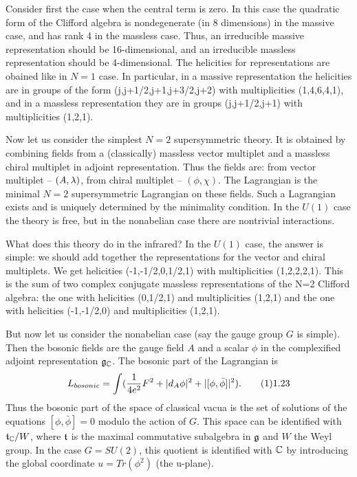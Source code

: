 Consider first the case when the central term is zero.
In this case the quadratic form of the Clifford algebra
is nondegenerate (in 8 dimensions) in the massive case, and
has rank 4 in the massless case. Thus, an irreducible massive representation
should be 16-dimensional, and an irreducible massless representation should be
4-dimensional. The helicities for representations
are obained like in $N=1$ case. In particular,
in a massive representation the helicities are in groups of the form
(j,j+1/2,j+1,j+3/2,j+2) with multiplicities (1,4,6,4,1), and
in a massless representation they are in groups (j,j+1/2,j+1) with
multiplicities (1,2,1).

Now let us consider the simplest $N=2$ supersymmetric theory.
It is obtained by combining fields from a (classically)
massless vector multiplet
and a massless chiral multiplet in adjoint representation.
Thus the fields are: from vector multiplet -- $(A,\lambda)$,
from chiral multiplet -- $(\phi,\chi)$.
The Lagrangian is the minimal $N=2$ supersymmetric Lagrangian on these fields.
Such a Lagrangian exists and is uniquely determined by the minimality
condition. In the $U(1)$ case the theory is free, but
in the nonabelian case there are nontrivial interactions.

What does this theory do in the infrared? In the $U(1)$ case, the answer
is simple: we should add together the representations for the vector and
chiral multiplets. We get helicities (-1,-1/2,0,1/2,1)
with multiplicities (1,2,2,2,1). This is the sum of two complex conjugate
massless representations of the N=2 Clifford algebra: the one with
helicities (0,1/2,1) and multiplicities (1,2,1) and the one with
helicities (-1,-1/2,0) and multiplicities (1,2,1).

But now let us consider the nonabelian case (say the gauge group $G$
is simple). Then the bosonic fields are the gauge field $A$
and a scalar $\phi$ in the complexified adjoint representation
$\frak g_\Bbb C$. The bosonic part of the Lagrangian is
$$
L_{bosonic}=
\int (\frac{1}{4e^2}F^2+|d_A\phi|^2+|[\phi,\bar\phi]|^2).\tag 11.23
$$
Thus the bosonic part of the space of classical vacua is the set of
solutions of the equations $[\phi,\bar\phi]=0$ modulo the action of $G$.
This space can be identified with ${\frak t}_\Bbb C/W$, where
${\frak t}$ is the maximal commutative subalgebra in $\frak g$
and $W$ the Weyl group. In the case $G=SU(2)$, this quotient is identified
with $\Bbb C$ by introducing the global coordinate $u=Tr(\phi^2)$
(the u-plane).

